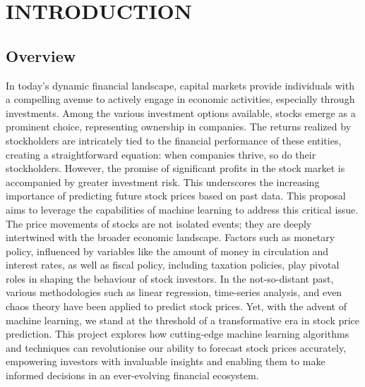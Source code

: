 \documentclass[./main.tex]{subfiles}
\begin{document}
\chapter{INTRODUCTION}

\section{Overview}
In today’s dynamic financial landscape, capital markets provide individuals with a compelling avenue to actively engage in economic activities, especially through investments. Among the various investment options available, stocks emerge as a prominent choice, representing ownership in companies. The returns realized by stockholders are intricately tied to the financial performance of these entities, creating a straightforward equation: when companies thrive, so do their stockholders. However, the promise of significant profits in the stock market is accompanied by greater investment risk. This underscores the increasing importance of predicting future stock prices based on past data. This proposal aims to leverage the capabilities of machine learning to address this critical issue.\cite{momin2019stock}
\medskip
\newline
\noindent
The price movements of stocks are not isolated events; they are deeply intertwined with the broader economic landscape.
Factors such as monetary policy, influenced by variables like the amount of money in circulation and interest rates, as well as fiscal policy, including taxation policies, play pivotal roles in shaping the behaviour of stock investors.\cite{ticknor2013bayesian}
\medskip
\newline
\noindent
In the not-so-distant past, various methodologies such as linear regression, time-series analysis, and even chaos theory have been applied to predict stock prices. Yet, with the advent of machine learning, we stand at the threshold of a transformative era in stock price prediction. This project explores how cutting-edge machine learning algorithms and techniques can revolutionise our ability to forecast stock prices accurately, empowering investors with invaluable insights and enabling them to make informed decisions in an ever-evolving financial ecosystem.
\end{document}
